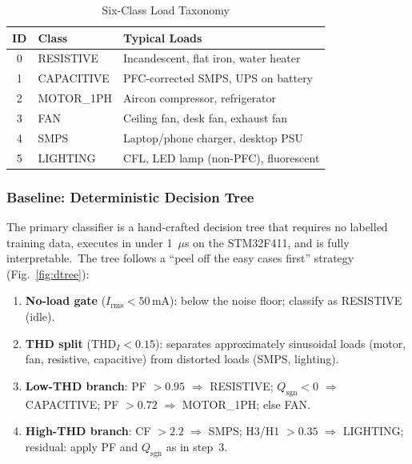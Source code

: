 \documentclass[conference]{IEEEtran}
\begin{document}
\begin{table}[t]
  \caption{Six-Class Load Taxonomy}
  \label{tab:classes}
  \centering
  \small
  \begin{tabular}{clp{3.4cm}}
    \toprule
    ID & Class & Typical Loads \\
    \midrule
    0 & RESISTIVE  & Incandescent, flat iron, water heater \\
    1 & CAPACITIVE & PFC-corrected SMPS, UPS on battery \\
    2 & MOTOR\_1PH & Aircon compressor, refrigerator \\
    3 & FAN        & Ceiling fan, desk fan, exhaust fan \\
    4 & SMPS       & Laptop/phone charger, desktop PSU \\
    5 & LIGHTING   & CFL, LED lamp (non-PFC), fluorescent \\
    \bottomrule
  \end{tabular}
\end{table}

\subsubsection{Baseline: Deterministic Decision Tree}

The primary classifier is a hand-crafted decision tree that requires
no labelled training data, executes in under 1~\(\mu\)s on the
STM32F411, and is fully interpretable.\ The tree follows a
``peel off the easy cases first'' strategy (Fig.~\ref{fig:dtree}):

\begin{enumerate}
  \item \textbf{No-load gate} (\(I_\text{rms} < 50\,\text{mA}\)):
        below the noise floor; classify as RESISTIVE (idle).
  \item \textbf{THD split} (\(\text{THD}_I < 0.15\)):
        separates approximately sinusoidal loads (motor, fan,
        resistive, capacitive) from distorted loads (SMPS, lighting).
  \item \textbf{Low-THD branch}:
        PF \(> 0.95\) \(\Rightarrow\) RESISTIVE;
        \(Q_\text{sgn} < 0\) \(\Rightarrow\) CAPACITIVE;
        PF \(> 0.72\) \(\Rightarrow\) MOTOR\_1PH; else FAN.
  \item \textbf{High-THD branch}:
        CF \(> 2.2\) \(\Rightarrow\) SMPS;
        H3/H1 \(> 0.35\) \(\Rightarrow\) LIGHTING;
        residual: apply PF and \(Q_\text{sgn}\) as in step~3.
\end{enumerate}
\end{document}
